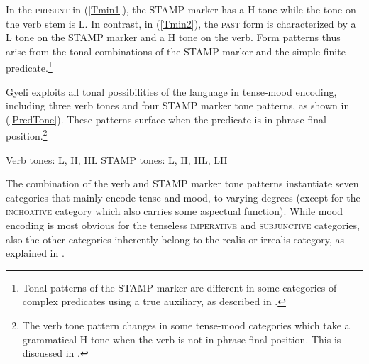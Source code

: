 \noindent In the \textsc{present} in (\ref{Tmin1}), the STAMP marker has a H tone while the tone on the verb stem is L. In contrast, in (\ref{Tmin2}), the \textsc{past} form is characterized by a L tone on the STAMP marker and a H tone on the verb.
Form patterns thus arise from the tonal combinations of the STAMP marker and the simple finite predicate.\footnote{Tonal patterns of the STAMP marker are different in some categories of complex predicates using a true auxiliary, as described in .} 

Gyeli exploits all tonal possibilities of the language in tense-mood encoding, including three verb tones and four STAMP marker tone patterns, as shown in (\ref{PredTone}). These patterns surface when the predicate is in phrase-final position.\footnote{The verb tone pattern changes in some tense-mood categories which take a grammatical H tone when the verb is not in phrase-final position. This is discussed in .}

\begin{exe} \ex \label{PredTone}
\begin{xlist}
\ex Verb tones: L, H, HL
\ex STAMP tones: L, H, HL, LH
\end{xlist}
\end{exe}

\noindent The combination of the verb and STAMP marker tone patterns instantiate seven categories that mainly encode tense and mood, to varying degrees (except for the \textsc{inchoative} category which also carries some aspectual function). While mood encoding is most obvious for the tenseless \textsc{imperative} and \textsc{subjunctive} categories, also the other categories inherently belong to the realis or irrealis category, as explained in .  

